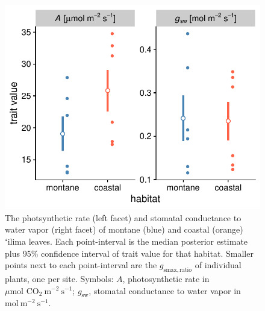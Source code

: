 \documentclass[
  letterpaper,
  DIV=11,
  numbers=noendperiod]{scrartcl}
\begin{document}
\begin{figure}
  \includegraphics{../figures/habitat-Ags.pdf}
  \caption{The photsynthetic rate (left facet) and stomatal conductance to water vapor (right facet) of montane (blue) and coastal (orange) ʻilima leaves. Each point-interval is the median posterior estimate plus 95\% confidence interval of trait value for that habitat. Smaller points next to each point-interval are the $g_\mathrm{smax,ratio}$ of individual plants, one per site. Symbols: $A$, photosynthetic rate in $\mu \text{mol CO}_2~\text{m}^{-2}~\text{s}^{-1}$; $g_\mathrm{sw}$, stomatal conductance to water vapor in $\text{mol}~\text{m}^{-2}~\text{s}^{-1}$.}
  \label{fig:habitat-Ags}
\end{figure}

\newpage
\end{document}

